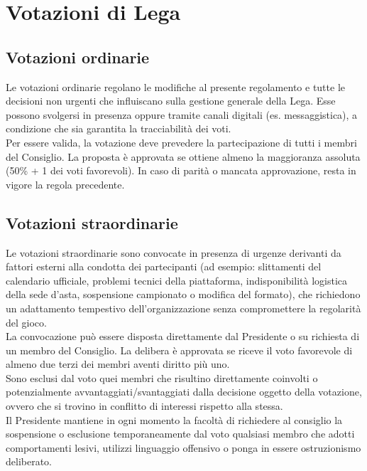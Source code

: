 \chapter{Votazioni di Lega}
\label{cap:Votazioni}

\section{Votazioni ordinarie}
\label{art:2.1}

Le votazioni ordinarie regolano le modifiche al presente regolamento e tutte le decisioni non urgenti che influiscano sulla gestione generale della Lega. Esse possono svolgersi in presenza oppure tramite canali digitali (es. messaggistica), a condizione che sia garantita la tracciabilità dei voti.\\

Per essere valida, la votazione deve prevedere la partecipazione di tutti i membri del Consiglio. La proposta è approvata se ottiene almeno la maggioranza assoluta (50\% + 1 dei voti favorevoli). In caso di parità o mancata approvazione, resta in vigore la regola precedente.

\section{Votazioni straordinarie}
\label{art:2.2}

Le votazioni straordinarie sono convocate in presenza di urgenze derivanti da fattori esterni alla condotta dei partecipanti (ad esempio: slittamenti del calendario ufficiale, problemi tecnici della piattaforma, indisponibilità logistica della sede d'asta, sospensione campionato o modifica del formato), che richiedono un adattamento tempestivo dell'organizzazione senza compromettere la regolarità del gioco.\\

La convocazione può essere disposta direttamente dal Presidente o su richiesta di un membro del Consiglio. La delibera è approvata se riceve il voto favorevole di almeno due terzi dei membri aventi diritto più uno.\\

Sono esclusi dal voto quei membri che risultino direttamente coinvolti o potenzialmente avvantaggiati/svantaggiati dalla decisione oggetto della votazione, ovvero che si trovino in conflitto di interessi rispetto alla stessa.\\

Il Presidente mantiene in ogni momento la facoltà di richiedere al consiglio la sospensione o esclusione temporaneamente dal voto qualsiasi membro che adotti comportamenti lesivi, utilizzi linguaggio offensivo o ponga in essere ostruzionismo deliberato.

